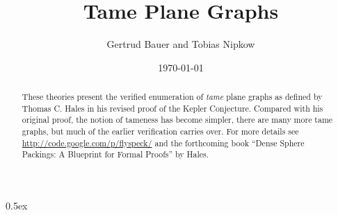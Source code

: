 \documentclass[11pt,a4paper]{article}
\begin{document}
\title{Tame Plane Graphs}
\author{Gertrud Bauer and Tobias Nipkow}
\date{\today}
\maketitle

\begin{abstract}
  These theories present the verified enumeration of \emph{tame} plane graphs
  as defined by Thomas C. Hales in his revised proof of the Kepler
  Conjecture. Compared with his original proof, the notion of tameness has
  become simpler, there are many more tame graphs, but much of the earlier
  verification \cite{NipkowBS-IJCAR06} carries over.
  For more details see \url{http://code.google.com/p/flyspeck/} and
  the forthcoming book ``Dense Sphere Packings: A Blueprint for Formal Proofs''
  by Hales.
\end{abstract}

\setcounter{tocdepth}{2}
\tableofcontents
\newpage

\parindent 0pt\parskip 0.5ex



\clearpage
{}
{}


\end{document}
